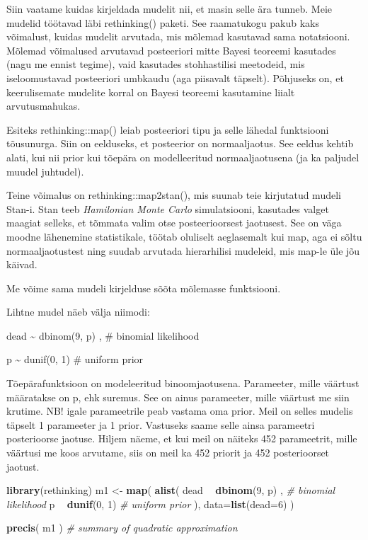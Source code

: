 \documentclass[]{book}
\newenvironment{Shaded}{\begin{snugshade}}{\end{snugshade}}
\newcommand{\KeywordTok}[1]{\textcolor[rgb]{0.13,0.29,0.53}{\textbf{#1}}}
\newcommand{\DataTypeTok}[1]{\textcolor[rgb]{0.13,0.29,0.53}{#1}}
\newcommand{\DecValTok}[1]{\textcolor[rgb]{0.00,0.00,0.81}{#1}}
\newcommand{\StringTok}[1]{\textcolor[rgb]{0.31,0.60,0.02}{#1}}
\newcommand{\CommentTok}[1]{\textcolor[rgb]{0.56,0.35,0.01}{\textit{#1}}}
\newcommand{\OperatorTok}[1]{\textcolor[rgb]{0.81,0.36,0.00}{\textbf{#1}}}
\newcommand{\NormalTok}[1]{#1}
\begin{document}
Siin vaatame kuidas kirjeldada mudelit nii, et masin selle ära tunneb.
Meie mudelid töötavad läbi rethinking() paketi. See raamatukogu pakub
kaks võimalust, kuidas mudelit arvutada, mis mõlemad kasutavad sama
notatsiooni. Mõlemad võimalused arvutavad posteeriori mitte Bayesi
teoreemi kasutades (nagu me ennist tegime), vaid kasutades stohhastilisi
meetodeid, mis iseloomustavad posteeriori umbkaudu (aga piisavalt
täpselt). Põhjuseks on, et keerulisemate mudelite korral on Bayesi
teoreemi kasutamine liialt arvutusmahukas.

Esiteks rethinking::map() leiab posteeriori tipu ja selle lähedal
funktsiooni tõusunurga. Siin on eelduseks, et posteerior on
normaaljaotus. See eeldus kehtib alati, kui nii prior kui tõepära on
modelleeritud normaaljaotusena (ja ka paljudel muudel juhtudel).

Teine võimalus on rethinking::map2stan(), mis suunab teie kirjutatud
mudeli Stan-i. Stan teeb \emph{Hamilonian Monte Carlo} simulatsiooni,
kasutades valget maagiat selleks, et tõmmata valim otse posteerioorsest
jaotusest. See on väga moodne lähenemine statistikale, töötab oluliselt
aeglasemalt kui map, aga ei sõltu normaaljaotustest ning suudab arvutada
hierarhilisi mudeleid, mis map-le üle jõu käivad.

Me võime sama mudeli kirjelduse sõõta mõlemasse funktsiooni.

Lihtne mudel näeb välja niimodi:

dead \textasciitilde{} dbinom(9, p) , \# binomial likelihood

p \textasciitilde{} dunif(0, 1) \# uniform prior

Tõepärafunktsioon on modeleeritud binoomjaotusena. Parameeter, mille
väärtust määratakse on p, ehk suremus. See on ainus parameeter, mille
väärtust me siin krutime. NB! igale parameetrile peab vastama oma prior.
Meil on selles mudelis täpselt 1 parameeter ja 1 prior. Vastuseks saame
selle ainsa parameetri posterioorse jaotuse. Hiljem näeme, et kui meil
on näiteks 452 parameetrit, mille väärtusi me koos arvutame, siis on
meil ka 452 priorit ja 452 posterioorset jaotust.

\begin{Shaded}
\begin{Highlighting}[]
\KeywordTok{library}\NormalTok{(rethinking)}
\NormalTok{m1 <-}\StringTok{ }\KeywordTok{map}\NormalTok{(}
    \KeywordTok{alist}\NormalTok{(}
\NormalTok{        dead }\OperatorTok{~}\StringTok{ }\KeywordTok{dbinom}\NormalTok{(}\DecValTok{9}\NormalTok{, p) ,  }\CommentTok{# binomial likelihood}
\NormalTok{        p }\OperatorTok{~}\StringTok{ }\KeywordTok{dunif}\NormalTok{(}\DecValTok{0}\NormalTok{, }\DecValTok{1}\NormalTok{)     }\CommentTok{# uniform prior}
\NormalTok{), }\DataTypeTok{data=}\KeywordTok{list}\NormalTok{(}\DataTypeTok{dead=}\DecValTok{6}\NormalTok{) )}

\KeywordTok{precis}\NormalTok{( m1 ) }\CommentTok{# summary of quadratic approximation}
\end{Highlighting}
\end{Shaded}
\end{document}
